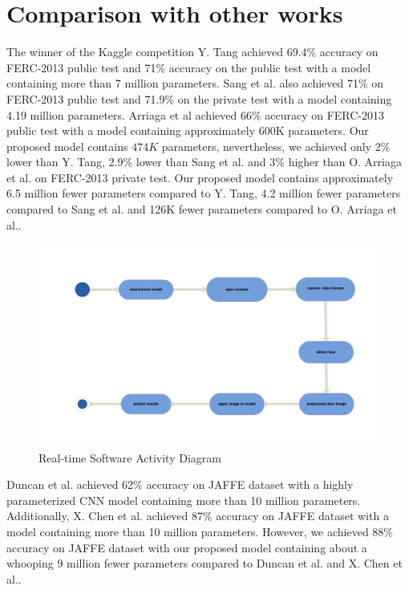 \documentclass[master]{thesis-uestc}
\begin{document}
\section{Comparison with other works}
The winner of the Kaggle competition Y. Tang\cite{tang2018} achieved 69.4\% accuracy on FERC-2013 public test and 71\% accuracy on the public test with a model containing more than 7 million parameters. Sang et al.\cite{sang-2017} also achieved 71\% on FERC-2013 public test and 71.9\% on the private test with a model containing 4.19 million parameters. Arriaga et al\cite{DBLP:journals/corr/abs-1710-07557} achieved 66\% accuracy on FERC-2013 public test with a model containing approximately 600K parameters. Our proposed model contains $474K$ parameters, nevertheless, we achieved only $2\%$ lower than Y. Tang\cite{tang2018}, 2.9\% lower than Sang et al.\cite{sang-2017} and 3\% higher than O. Arriaga et al.\cite{DBLP:journals/corr/abs-1710-07557} on FERC-2013 private test. Our proposed model contains approximately 6.5 million fewer parameters compared to Y. Tang\cite{tang2018}, 4.2 million fewer parameters compared to Sang et al.\cite{sang-2017} and 126K fewer parameters compared to O. Arriaga et al.\cite{DBLP:journals/corr/abs-1710-07557}.

\begin{figure}[ht]
\includegraphics[width=6in]{pic/activity_diagram.pdf}
\caption{Real-time Software Activity Diagram}
\label{system_description}
\end{figure}

Duncan et al.\cite{duncan2016} achieved 62\% accuracy on JAFFE dataset with a highly parameterized CNN model containing more than 10 million parameters. Additionally, X. Chen et al.\cite{7988558} achieved 87\% accuracy on JAFFE dataset with a model containing more than 10 million parameters. However, we achieved $88\%$ accuracy on JAFFE dataset with our proposed model containing about a whooping 9 million fewer parameters compared to Duncan et al.\cite{duncan2016} and X. Chen et al.\cite{7988558}.
\end{document}
